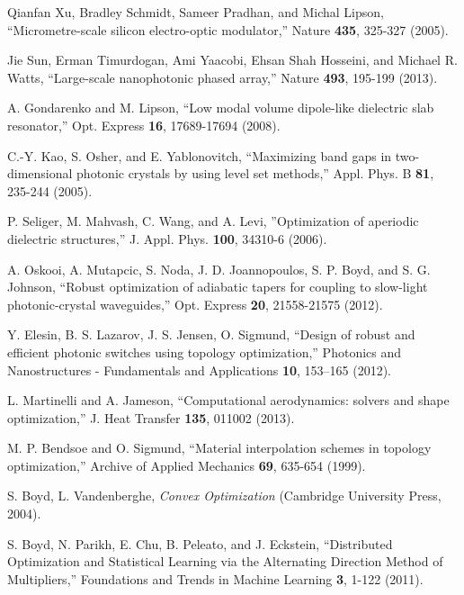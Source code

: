 \begin{thebibliography}{99}

    Qianfan Xu, Bradley Schmidt, Sameer Pradhan, and Michal Lipson,
    ``Micrometre-scale silicon electro-optic modulator,''
    Nature \textbf{435}, 325-327 (2005).

    Jie Sun, Erman Timurdogan, Ami Yaacobi, Ehsan Shah Hosseini, and Michael R. Watts,
    ``Large-scale nanophotonic phased array,''
    Nature \textbf{493}, 195-199 (2013).

    A. Gondarenko and M. Lipson, 
    ``Low modal volume dipole-like dielectric slab resonator,'' 
    Opt. Express \textbf{16}, 17689-17694 (2008).  

 C.-Y. Kao, S. Osher, and E. Yablonovitch, 
    ``Maximizing band gaps in two-dimensional photonic crystals by using level set methods,'' Appl. Phys. B \textbf{81}, 235-244 (2005).

    P. Seliger, M. Mahvash, C. Wang, and A. Levi,
    ''Optimization of aperiodic dielectric structures,''
    J. Appl. Phys. \textbf{100}, 34310-6 (2006).

 A. Oskooi, A. Mutapcic, S. Noda, J. D. Joannopoulos, S. P. Boyd, and S. G. Johnson, 
    ``Robust optimization of adiabatic tapers for coupling to slow-light photonic-crystal waveguides,'' Opt. Express \textbf{20}, 21558-21575 (2012).

 Y. Elesin, B. S. Lazarov, J. S. Jensen, O. Sigmund, 
    ``Design of robust and efficient photonic switches using topology optimization,''
    Photonics and Nanostructures - Fundamentals and Applications \textbf{10}, 
    153–165 (2012).

 L. Martinelli and A. Jameson, 
    ``Computational aerodynamics: solvers and shape optimization,''
    J. Heat Transfer \textbf{135}, 011002 (2013).

 M. P. Bendsoe and O. Sigmund,
    ``Material interpolation schemes in topology optimization,''
    Archive of Applied Mechanics \textbf{69}, 635-654 (1999).

 S. Boyd, L. Vandenberghe, \emph{Convex Optimization} (Cambridge University Press, 2004).

 S. Boyd, N. Parikh, E. Chu, B. Peleato, and J. Eckstein,
    ``Distributed Optimization and Statistical Learning via the Alternating Direction Method of Multipliers,''
    Foundations and Trends in Machine Learning \textbf{3}, 1-122 (2011). 


\end{thebibliography}
